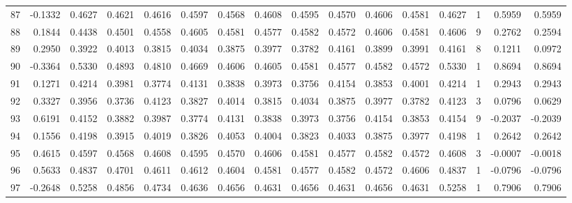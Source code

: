 \begin{tabular}{lrrrrrrrrrrrrrrr}
87  &     -0.1332 &  0.4627 &  0.4621 &  0.4616 &  0.4597 &  0.4568 &  0.4608 &  0.4595 &  0.4570 &  0.4606 &   0.4581 &     0.4627 &      1 &                    0.5959 &                     0.5959 \\
88  &      0.1844 &  0.4438 &  0.4501 &  0.4558 &  0.4605 &  0.4581 &  0.4577 &  0.4582 &  0.4572 &  0.4606 &   0.4581 &     0.4606 &      9 &                    0.2762 &                     0.2594 \\
89  &      0.2950 &  0.3922 &  0.4013 &  0.3815 &  0.4034 &  0.3875 &  0.3977 &  0.3782 &  0.4161 &  0.3899 &   0.3991 &     0.4161 &      8 &                    0.1211 &                     0.0972 \\
90  &     -0.3364 &  0.5330 &  0.4893 &  0.4810 &  0.4669 &  0.4606 &  0.4605 &  0.4581 &  0.4577 &  0.4582 &   0.4572 &     0.5330 &      1 &                    0.8694 &                     0.8694 \\
91  &      0.1271 &  0.4214 &  0.3981 &  0.3774 &  0.4131 &  0.3838 &  0.3973 &  0.3756 &  0.4154 &  0.3853 &   0.4001 &     0.4214 &      1 &                    0.2943 &                     0.2943 \\
92  &      0.3327 &  0.3956 &  0.3736 &  0.4123 &  0.3827 &  0.4014 &  0.3815 &  0.4034 &  0.3875 &  0.3977 &   0.3782 &     0.4123 &      3 &                    0.0796 &                     0.0629 \\
93  &      0.6191 &  0.4152 &  0.3882 &  0.3987 &  0.3774 &  0.4131 &  0.3838 &  0.3973 &  0.3756 &  0.4154 &   0.3853 &     0.4154 &      9 &                   -0.2037 &                    -0.2039 \\
94  &      0.1556 &  0.4198 &  0.3915 &  0.4019 &  0.3826 &  0.4053 &  0.4004 &  0.3823 &  0.4033 &  0.3875 &   0.3977 &     0.4198 &      1 &                    0.2642 &                     0.2642 \\
95  &      0.4615 &  0.4597 &  0.4568 &  0.4608 &  0.4595 &  0.4570 &  0.4606 &  0.4581 &  0.4577 &  0.4582 &   0.4572 &     0.4608 &      3 &                   -0.0007 &                    -0.0018 \\
96  &      0.5633 &  0.4837 &  0.4701 &  0.4611 &  0.4612 &  0.4604 &  0.4581 &  0.4577 &  0.4582 &  0.4572 &   0.4606 &     0.4837 &      1 &                   -0.0796 &                    -0.0796 \\
97  &     -0.2648 &  0.5258 &  0.4856 &  0.4734 &  0.4636 &  0.4656 &  0.4631 &  0.4656 &  0.4631 &  0.4656 &   0.4631 &     0.5258 &      1 &                    0.7906 &                     0.7906 \\

\end{tabular}
